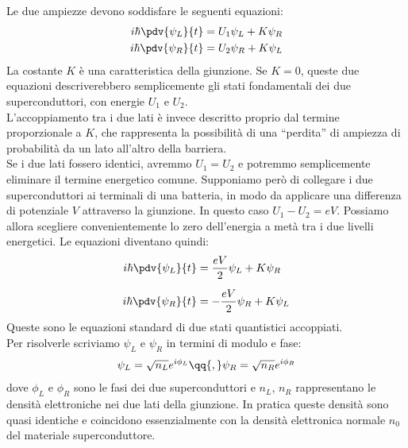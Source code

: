 Le due ampiezze devono soddisfare le seguenti equazioni:
\begin{equation*}
\begin{split}
    i\hbar \pdv{\psi_L}{t}
    &= U_1\psi_L + K\psi_R
    \\
    i\hbar \pdv{\psi_R}{t}
    &= U_2\psi_R + K\psi_L
\end{split}
\end{equation*}
La costante $K$ è una caratteristica della giunzione. Se $K=0$, queste due equazioni descriverebbero semplicemente gli stati fondamentali dei due superconduttori, con energie $U_1$ e $U_2$.\\
L'accoppiamento tra i due lati è invece descritto proprio dal termine proporzionale a $K$, che rappresenta la possibilità di una ``perdita'' di ampiezza di probabilità da un lato all'altro della barriera.\\
Se i due lati fossero identici, avremmo $U_1=U_2$ e potremmo semplicemente eliminare il termine energetico comune. Supponiamo però di collegare i due superconduttori ai terminali di una batteria, in modo da applicare una differenza di potenziale $V$ attraverso la giunzione. In questo caso $U_1-U_2=eV$. Possiamo allora scegliere convenientemente lo zero dell'energia a metà tra i due livelli energetici. Le equazioni diventano quindi:
\begin{equation*}
\begin{split}
    i\hbar \pdv{\psi_L}{t}
    &= \frac{eV}{2}\psi_L + K\psi_R
    \\[0.2cm]
    i\hbar \pdv{\psi_R}{t}
    &= -\frac{eV}{2}\psi_R + K\psi_L
\end{split}
\end{equation*}
Queste sono le equazioni standard di due stati quantistici accoppiati.\\
Per risolverle scriviamo $\psi_L$ e $\psi_R$ in termini di modulo e fase:
\begin{equation*}
    \psi_L
    =
    \sqrt{n_L}e^{i\phi_L}
    \qq{,}
    \psi_R
    =
    \sqrt{n_R}e^{i\phi_R}
\end{equation*}
dove $\phi_L$ e $\phi_R$ sono le fasi dei due superconduttori e $n_L$, $n_R$ rappresentano le densità elettroniche nei due lati della giunzione. In pratica queste densità sono quasi identiche e coincidono essenzialmente con la densità elettronica normale $n_0$ del materiale superconduttore.\\
